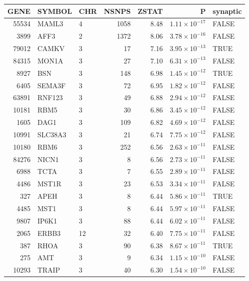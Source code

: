 \begin{table}[ht]
\centering
\begin{adjustbox}{totalheight=10in}


\begin{tabular}{rllrrrl}
  \hline
GENE & SYMBOL & CHR & NSNPS & ZSTAT & P & synaptic \\ 
  \hline
55534 & MAML3 & 4 & 1058 & 8.48 & $1.11 \times 10^{-17}$ & FALSE \\ 
  3899 & AFF3 & 2 & 1372 & 8.06 & $3.78 \times 10^{-16}$ & FALSE \\ 
  79012 & CAMKV & 3 &  17 & 7.16 & $3.95 \times 10^{-13}$ & TRUE \\ 
  84315 & MON1A & 3 &  27 & 7.10 & $6.31 \times 10^{-13}$ & FALSE \\ 
  8927 & BSN & 3 & 148 & 6.98 & $1.45 \times 10^{-12}$ & TRUE \\ 
  6405 & SEMA3F & 3 &  72 & 6.95 & $1.82 \times 10^{-12}$ & FALSE \\ 
  63891 & RNF123 & 3 &  49 & 6.88 & $2.94 \times 10^{-12}$ & FALSE \\ 
  10181 & RBM5 & 3 &  30 & 6.86 & $3.45 \times 10^{-12}$ & FALSE \\ 
  1605 & DAG1 & 3 & 109 & 6.82 & $4.69 \times 10^{-12}$ & FALSE \\ 
  10991 & SLC38A3 & 3 &  21 & 6.74 & $7.75 \times 10^{-12}$ & FALSE \\ 
  10180 & RBM6 & 3 & 252 & 6.56 & $2.63 \times 10^{-11}$ & FALSE \\ 
  84276 & NICN1 & 3 &   8 & 6.56 & $2.73 \times 10^{-11}$ & FALSE \\ 
  6988 & TCTA & 3 &   7 & 6.55 & $2.89 \times 10^{-11}$ & FALSE \\ 
  4486 & MST1R & 3 &  23 & 6.53 & $3.34 \times 10^{-11}$ & FALSE \\ 
  327 & APEH & 3 &   8 & 6.44 & $5.86 \times 10^{-11}$ & TRUE \\ 
  4485 & MST1 & 3 &   8 & 6.44 & $5.97 \times 10^{-11}$ & FALSE \\ 
  9807 & IP6K1 & 3 &  88 & 6.44 & $6.02 \times 10^{-11}$ & FALSE \\ 
  2065 & ERBB3 & 12 &  32 & 6.40 & $7.75 \times 10^{-11}$ & FALSE \\ 
  387 & RHOA & 3 &  90 & 6.38 & $8.67 \times 10^{-11}$ & TRUE \\ 
  275 & AMT & 3 &   9 & 6.34 & $1.15 \times 10^{-10}$ & FALSE \\ 
  10293 & TRAIP & 3 &  40 & 6.30 & $1.54 \times 10^{-10}$ & FALSE \\ 

\end{tabular}
\end{adjustbox}
\end{table}
